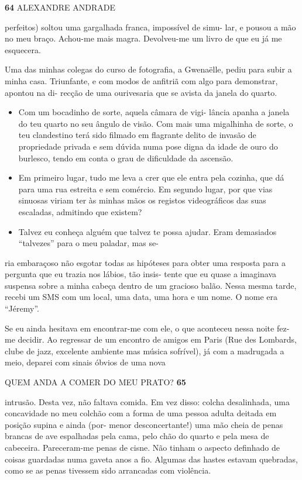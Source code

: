 \textbf{64 }ALEXANDRE ANDRADE

perfeitos) soltou uma gargalhada franca, impossível de simu- lar, e
pousou a mão no meu braço. Achou-me mais magra. Devolveu-me um livro de
que eu já me esquecera.

Uma das minhas colegas do curso de fotografia, a Gwenaëlle, pediu para
subir a minha casa. Triunfante, e com modos de anfitriã com algo para
demonstrar, apontou na di- recção de uma ourivesaria que se avista da
janela do quarto.

\begin{itemize}
\tightlist
\item
  Com um bocadinho de sorte, aquela câmara de vigi- lância apanha a
  janela do teu quarto no seu ângulo de visão. Com mais uma migalhinha
  de sorte, o teu clandestino terá sido filmado em flagrante delito de
  invasão de propriedade privada e sem dúvida numa pose digna da idade
  de ouro do burlesco, tendo em conta o grau de dificuldade da ascensão.
\item
  Em primeiro lugar, tudo me leva a crer que ele entra pela cozinha, que
  dá para uma rua estreita e sem comércio. Em segundo lugar, por que
  vias sinuosas viriam ter às minhas mãos os registos videográficos das
  suas escaladas, admitindo que existem?
\item
  Talvez eu conheça alguém que talvez te possa ajudar. Eram demasiados
  ``talvezes'' para o meu paladar, mas se-
\end{itemize}

ria embaraçoso não esgotar todas as hipóteses para obter uma resposta
para a pergunta que eu trazia nos lábios, tão insis- tente que eu quase
a imaginava suspensa sobre a minha cabeça dentro de um gracioso balão.
Nessa mesma tarde, recebi um SMS com um local, uma data, uma hora e um
nome. O nome era ``Jéremy''.

Se eu ainda hesitava em encontrar-me com ele, o que aconteceu nessa
noite fez-me decidir. Ao regressar de um encontro de amigos em Paris
(Rue des Lombards, clube de jazz, excelente ambiente mas música
sofrível), já com a madrugada a meio, deparei com sinais óbvios de uma
nova

QUEM ANDA A COMER DO MEU PRATO? \textbf{65}

intrusão. Desta vez, não faltava comida. Em vez disso: colcha
desalinhada, uma concavidade no meu colchão com a forma de uma pessoa
adulta deitada em posição supina e ainda (por- menor desconcertante!)
uma mão cheia de penas brancas de ave espalhadas pela cama, pelo chão do
quarto e pela mesa de cabeceira. Pareceram-me penas de cisne. Não tinham
o aspecto definhado de coisas guardadas numa gaveta anos a fio. Algumas
das hastes estavam quebradas, como se as penas tivessem sido arrancadas
com violência.

